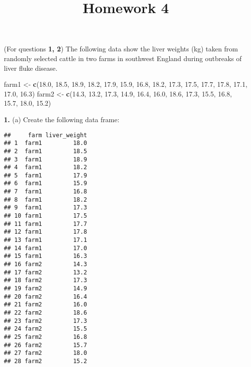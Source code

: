 \documentclass[]{article}
\title{Homework 4}
\author{}
\date{}
\newenvironment{Shaded}{\begin{snugshade}}{\end{snugshade}}
\newcommand{\KeywordTok}[1]{\textcolor[rgb]{0.13,0.29,0.53}{\textbf{#1}}}
\newcommand{\FloatTok}[1]{\textcolor[rgb]{0.00,0.00,0.81}{#1}}
\newcommand{\StringTok}[1]{\textcolor[rgb]{0.31,0.60,0.02}{#1}}
\newcommand{\NormalTok}[1]{#1}
\begin{document}
\maketitle

\bigskip

(For questions \textbf{1, 2}) The following data show the liver weights
(kg) taken from randomly selected cattle in two farms in southwest
England during outbreaks of liver fluke disease.

\begin{Shaded}
\begin{Highlighting}[]
\NormalTok{farm1 <-}\StringTok{ }\KeywordTok{c}\NormalTok{(}\FloatTok{18.0}\NormalTok{, }\FloatTok{18.5}\NormalTok{, }\FloatTok{18.9}\NormalTok{, }\FloatTok{18.2}\NormalTok{, }\FloatTok{17.9}\NormalTok{, }\FloatTok{15.9}\NormalTok{, }\FloatTok{16.8}\NormalTok{, }\FloatTok{18.2}\NormalTok{, }\FloatTok{17.3}\NormalTok{, }\FloatTok{17.5}\NormalTok{, }\FloatTok{17.7}\NormalTok{, }\FloatTok{17.8}\NormalTok{, }\FloatTok{17.1}\NormalTok{,}
           \FloatTok{17.0}\NormalTok{, }\FloatTok{16.3}\NormalTok{)}
\NormalTok{farm2 <-}\StringTok{ }\KeywordTok{c}\NormalTok{(}\FloatTok{14.3}\NormalTok{, }\FloatTok{13.2}\NormalTok{, }\FloatTok{17.3}\NormalTok{, }\FloatTok{14.9}\NormalTok{, }\FloatTok{16.4}\NormalTok{, }\FloatTok{16.0}\NormalTok{, }\FloatTok{18.6}\NormalTok{, }\FloatTok{17.3}\NormalTok{, }\FloatTok{15.5}\NormalTok{, }\FloatTok{16.8}\NormalTok{, }\FloatTok{15.7}\NormalTok{, }\FloatTok{18.0}\NormalTok{, }\FloatTok{15.2}\NormalTok{)}
\end{Highlighting}
\end{Shaded}

\textbf{1.} (a) Create the following data frame:

\begin{verbatim}
##     farm liver_weight
## 1  farm1         18.0
## 2  farm1         18.5
## 3  farm1         18.9
## 4  farm1         18.2
## 5  farm1         17.9
## 6  farm1         15.9
## 7  farm1         16.8
## 8  farm1         18.2
## 9  farm1         17.3
## 10 farm1         17.5
## 11 farm1         17.7
## 12 farm1         17.8
## 13 farm1         17.1
## 14 farm1         17.0
## 15 farm1         16.3
## 16 farm2         14.3
## 17 farm2         13.2
## 18 farm2         17.3
## 19 farm2         14.9
## 20 farm2         16.4
## 21 farm2         16.0
## 22 farm2         18.6
## 23 farm2         17.3
## 24 farm2         15.5
## 25 farm2         16.8
## 26 farm2         15.7
## 27 farm2         18.0
## 28 farm2         15.2
\end{verbatim}
\end{document}
